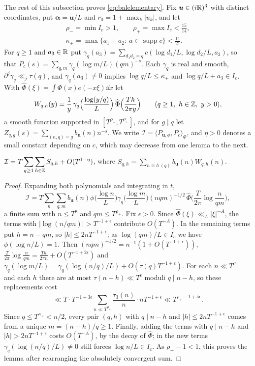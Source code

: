 \documentclass[11pt,colorlinks]{charlie}
\newcommand{\ip}[2]{\langle #1,#2\rangle}
\begin{document}
The rest of this subsection proves \eqref{eq:balelementary}. Fix $\boldsymbol u\in(i\mathbb{R})^3$ with distinct coordinates, put $\boldsymbol\alpha=\boldsymbol u/L$ and $r_0=1+\max_k|u_k|$, and let
\begin{gather*}
 \rho_-=\min I_c>1,\qquad\rho_+=\max I_c<\tfrac{15}{14},\\
 \kappa_+=\max\{a_1+a_2:\ a\in\operatorname{supp}c\}<\tfrac{11}{21}.
\end{gather*}
For $q\ge1$ and $a_3\in\mathbb{R}$ put $\gamma_q(a_3)=\sum_{d_1d_2=q}c(\log d_1/L,\log d_2/L,a_3)$, so that $P_c(s)=\sum_{q,m}\gamma_q(\log m/L)(qm)^{-s}$. Each $\gamma_q$ is real and smooth, $\partial^j\gamma_q\ll_j\tau(q)$, and $\gamma_q(a_3)\ne0$ implies $\log q/L\le\kappa_+$ and $\log q/L+a_3\in I_c$. With $\widehat\Phi(\xi)=\int\Phi(x)e(-x\xi)\dd x$ let
\[
 W_{q,h}(y)=\frac1y\,\gamma_q\Big(\frac{\log(y/q)}L\Big)\,\widehat\Phi\Big(\frac{Th}{2\pi y}\Big)\qquad(q\ge1,\ h\in\mathbb{Z},\ y>0),
\]
a smooth function supported in $[T^{\rho_-},T^{\rho_+}]$, and for $g\mid q$ let $Z_{q,g}(s)=\sum_{(n,q)=g}b_{\boldsymbol u}(n)n^{-s}$. We write $\mathcal I=\ip{P_{\boldsymbol u,\phi}}{P_c}_\Phi$, and $\eta>0$ denotes a small constant depending on $c$, which may decrease from one lemma to the next.

\begin{lemma}[Truncation]\label{lem:baltrunc}
$\displaystyle\mathcal I=T\sum_{q\ge1}\sum_{h\in\mathbb{Z}}S_{q,h}+O(T^{1-\eta})$, where $S_{q,h}=\sum_{n\equiv h\ (q)}b_{\boldsymbol u}(n)W_{q,h}(n)$.
\end{lemma}
\begin{proof}
Expanding both polynomials and integrating in $t$,
\[
 \mathcal I=T\sum_n\sum_{q,m}b_{\boldsymbol u}(n)\phi\Big(\frac{\log n}L\Big)\gamma_q\Big(\frac{\log m}L\Big)(nqm)^{-1/2}\,\widehat\Phi\Big(\frac T{2\pi}\log\frac n{qm}\Big),
\]
a finite sum with $n\le T^2$ and $qm\le T^{\rho_+}$. Fix $\epsilon>0$. Since $\widehat\Phi(\xi)\ll_A|\xi|^{-A}$, the terms with $|\log(n/qm)|>T^{-1+\epsilon}$ contribute $O(T^{-A})$. In the remaining terms put $h=n-qm$, so $|h|\le2nT^{-1+\epsilon}$; as $\log(qm)/L\in I_c$ we have $\phi(\log n/L)=1$. Then $(nqm)^{-1/2}=n^{-1}(1+O(T^{-1+\epsilon}))$, $\frac T{2\pi}\log\frac n{qm}=\frac{Th}{2\pi n}+O(T^{-1+2\epsilon})$ and $\gamma_q(\log m/L)=\gamma_q(\log(n/q)/L)+O(\tau(q)T^{-1+\epsilon})$. For each $n\ll T^{\rho_+}$ and each $h$ there are at most $\tau(n-h)\ll T^\epsilon$ moduli $q\mid n-h$, so these replacements cost
\[
 \ll T\cdot T^{-1+3\epsilon}\sum_{n\ll T^{\rho_+}}\frac{\tau_3(n)}n\cdot nT^{-1+\epsilon}\ll T^{\rho_+-1+5\epsilon}.
\]
Since $q\le T^{\kappa_+}<n/2$, every pair $(q,h)$ with $q\mid n-h$ and $|h|\le2nT^{-1+\epsilon}$ comes from a unique $m=(n-h)/q\ge1$. Finally, adding the terms with $q\mid n-h$ and $|h|>2nT^{-1+\epsilon}$ costs $O(T^{-A})$, by the decay of $\widehat\Phi$; in the new terms $\gamma_q(\log(n/q)/L)\ne0$ still forces $\log n/L\in I_c$. As $\rho_+-1<1$, this proves the lemma after rearranging the absolutely convergent sum.
\end{proof}
\end{document}
